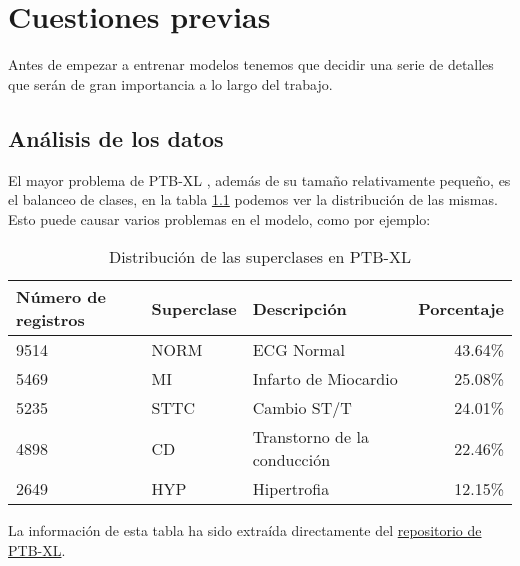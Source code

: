 \chapter{Cuestiones previas}
\label{cap:pre_datos}
Antes de empezar a entrenar modelos tenemos que decidir una serie de detalles que serán de gran importancia a lo largo del trabajo.

\section{Análisis de los datos}
El mayor problema de PTB-XL \citep{ptbxldb}, además de su tamaño relativamente pequeño, es el balanceo de clases, en la tabla \ref{tab:dist} podemos ver la distribución de las mismas. Esto puede causar varios problemas en el modelo, como por ejemplo:

\begin{table}[htbp] 
\centering
\begin{tabular}{|lllr|}
	\hline
	Número de registros & Superclase & Descripción & Porcentaje \\
	\hline
	9514 & NORM & ECG Normal & 43.64\% \\
	5469 & MI & Infarto de Miocardio & 25.08\% \\
	5235 & STTC & Cambio ST/T & 24.01\% \\
	4898 & CD & Transtorno de la conducción & 22.46\% \\
	2649 & HYP & Hipertrofia & 12.15\% \\
	\hline

\end{tabular}
\caption{Distribución de las superclases en PTB-XL}
\label{tab:dist}
\begin{tablenotes}
	\small
	\item La información de esta tabla ha sido extraída directamente del \href{https://physionet.org/content/ptb-xl/1.0.3/}{repositorio de PTB-XL}.
\end{tablenotes}
\end{table}

